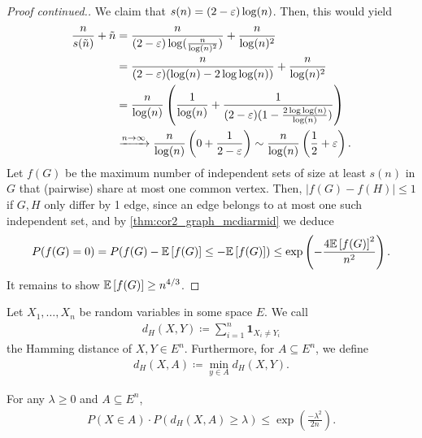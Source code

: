 \begin{proof}[Proof continued.]
    We claim that $s(n)=(2-\varepsilon) \log(n)$.
    Then, this would yield
    \begin{align*}
        \frac{n}{s(\tilde n)}+\tilde n & = \frac{n}{(2-\varepsilon) \log(\frac{n}{\log(n)^2})} + \frac{n}{\log(n)^2}                                                                           \\
                                       & = \frac{n}{(2-\varepsilon)(\log(n) - 2\log \log (n))} + \frac{n}{\log(n)^2}                                                                           \\
                                       & = \frac{n}{\log (n)} \left(\frac{1}{\log(n)} + \frac{1}{(2-\varepsilon)(1-\frac{2 \log \log (n)}{\log(n)})}\right)                                    \\
                                       & \xrightarrow{n \rightarrow \infty} \frac{n}{\log (n)}\left(0 + \frac{1}{2-\varepsilon}\right) \sim \frac{n}{\log (n)}\left(\frac{1}{2} + \varepsilon\right).
    \end{align*}
    Let $f(G)$ be the maximum number of independent sets of size at least $s(n)$ in $G$ that (pairwise) share at most one common vertex.
    Then, $|f(G) - f(H)| \leq 1$ if $G,H$ only differ by 1 edge, since an edge belongs to at most one such independent set,
    and by \autoref{thm:cor2_graph_mcdiarmid} we deduce
    \begin{align*}
        P(f(G) = 0) = P(f(G) - \mathbb{E}\left[f(G)\right] \leq - \mathbb{E}\left[f(G)\right]) \leq \exp\left(-\frac{4 \mathbb{E}\left[f(G)\right]^2}{n^2}\right).
    \end{align*}
    It remains to show $\mathbb{E}\left[f(G)\right] \geq n^{4/3}$.
\end{proof}
\begin{definition}
    Let $X_1, \dots, X_n$ be random variables in some space $E$.
    We call
    \begin{align*}
        d_H(X,Y) \coloneqq \sum_{i=1}^n \mathbf{1}_{X_i \neq Y_i}
    \end{align*}
    the Hamming distance of $X,Y \in E^n$.
    Furthermore, for $A \subseteq E^n$, we define
    \begin{align*}
        d_H(X,A) \coloneqq \min_{y \in A} d_H(X,Y).
    \end{align*}
\end{definition}
\begin{theorem} \label{thm:distance_concentration}
    For any $\lambda \geq 0$ and $A \subseteq E^n$,
    \begin{align*}
        P(X \in A) \cdot P(d_H(X,A) \geq \lambda) \leq \exp\left(\frac{-\lambda^2}{2n}\right).
    \end{align*}
\end{theorem}
